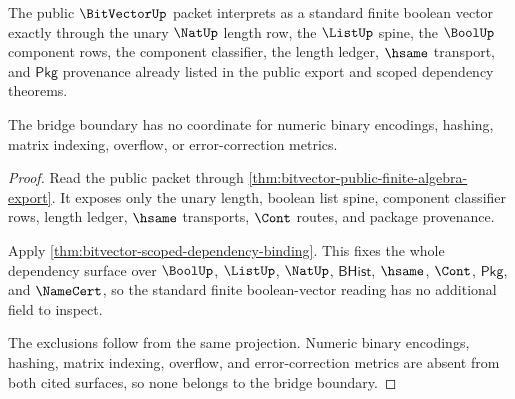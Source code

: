 \begin{theorem}\label{thm:bitvector-standard-bridge-boundary}
The public $\BitVectorUp$ packet interprets as a standard finite boolean
vector exactly through the unary $\NatUp$ length row, the $\ListUp$ spine, the
$\BoolUp$ component rows, the component classifier, the length ledger, $\hsame$
transport, and $\mathsf{Pkg}$ provenance already listed in the public export
and scoped dependency theorems.

The bridge boundary has no coordinate for numeric binary encodings, hashing,
matrix indexing, overflow, or error-correction metrics.
\end{theorem}
\begin{proof}
Read the public packet through
\autoref{thm:bitvector-public-finite-algebra-export}. It exposes only the
unary length, boolean list spine, component classifier rows, length ledger,
$\hsame$ transports, $\Cont$ routes, and package provenance.

Apply \autoref{thm:bitvector-scoped-dependency-binding}. This fixes the whole
dependency surface over $\BoolUp$, $\ListUp$, $\NatUp$, $\mathsf{BHist}$,
$\hsame$, $\Cont$, $\mathsf{Pkg}$, and $\NameCert$, so the standard finite
boolean-vector reading has no additional field to inspect.

The exclusions follow from the same projection. Numeric binary encodings,
hashing, matrix indexing, overflow, and error-correction metrics are absent
from both cited surfaces, so none belongs to the bridge boundary.
\end{proof}

